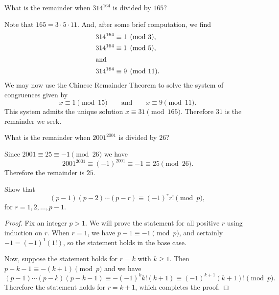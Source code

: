 What is the remainder when $314^{164}$ is divided by $165$?
\begin{solution}
  Note that $165 = 3\cdot5\cdot11$. And, after some brief computation,
  we find
  \begin{align*}
    314^{164}&\equiv 1\pmod3, \\
    314^{164}&\equiv 1\pmod5, \\
    \intertext{and}
    314^{164}&\equiv 9\pmod{11}.
  \end{align*}
  We may now use the Chinese Remainder Theorem to solve the system of
  congruences given by
  \begin{equation*}
    x \equiv 1\pmod{15} \qquad\text{and}\qquad x \equiv 9 \pmod{11}.
  \end{equation*}
  This system admits the unique solution
  $x\equiv31\pmod{165}$. Therefore $31$ is the remainder we seek.
\end{solution}

 What is the remainder when $2001^{2001}$ is divided by $26$?
\begin{solution}
  Since $2001\equiv25\equiv-1\pmod{26}$ we have
  \begin{equation*}
    2001^{2001}\equiv(-1)^{2001}\equiv-1\equiv25\pmod{26}.
  \end{equation*}
  Therefore the remainder is $25$.
\end{solution}

 Show that
\begin{equation*}
  (p - 1)(p - 2)\cdots(p - r) \equiv (-1)^rr!\pmod p,
\end{equation*}
for $r = 1, 2, \dots, p - 1$.
\begin{proof}
  Fix an integer $p > 1$. We will prove the statement for all positive
  $r$ using induction on $r$. When $r = 1$, we have
  $p - 1 \equiv -1 \pmod{p}$, and certainly $-1 = (-1)^1(1!)$, so the
  statement holds in the base case.

  Now, suppose the statement holds for $r = k$ with
  $k\geq1$. Then $p - k - 1\equiv -(k + 1)\pmod{p}$ and we have
  \begin{equation*}
    (p - 1)\cdots(p - k)(p - k - 1)
    \equiv-(-1)^kk!(k + 1) \equiv (-1)^{k+1}(k+1)!\pmod{p}.
  \end{equation*}
  Therefore the statement holds for $r = k + 1$, which completes the
  proof.
\end{proof}

